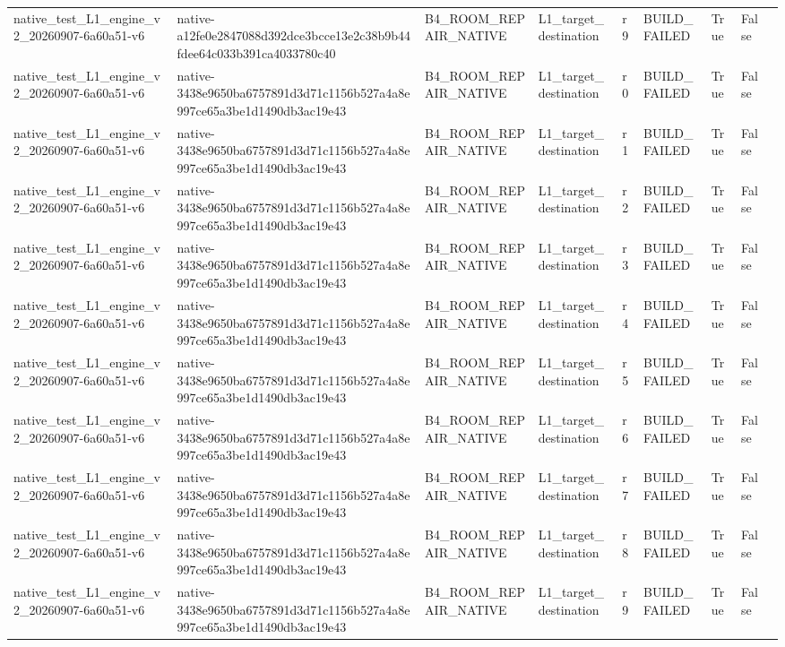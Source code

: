 \begin{tabular}{lllllllll}
native\_test\_L1\_engine\_v2\_20260907-6a60a51-v6 & native-a12fe0e2847088d392dce3bcce13e2c38b9b44fdee64c033b391ca4033780c40 & B4\_ROOM\_REPAIR\_NATIVE & L1\_target\_destination & r9 & BUILD\_FAILED & True & False &  \\
native\_test\_L1\_engine\_v2\_20260907-6a60a51-v6 & native-3438e9650ba6757891d3d71c1156b527a4a8e997ce65a3be1d1490db3ac19e43 & B4\_ROOM\_REPAIR\_NATIVE & L1\_target\_destination & r0 & BUILD\_FAILED & True & False &  \\
native\_test\_L1\_engine\_v2\_20260907-6a60a51-v6 & native-3438e9650ba6757891d3d71c1156b527a4a8e997ce65a3be1d1490db3ac19e43 & B4\_ROOM\_REPAIR\_NATIVE & L1\_target\_destination & r1 & BUILD\_FAILED & True & False &  \\
native\_test\_L1\_engine\_v2\_20260907-6a60a51-v6 & native-3438e9650ba6757891d3d71c1156b527a4a8e997ce65a3be1d1490db3ac19e43 & B4\_ROOM\_REPAIR\_NATIVE & L1\_target\_destination & r2 & BUILD\_FAILED & True & False &  \\
native\_test\_L1\_engine\_v2\_20260907-6a60a51-v6 & native-3438e9650ba6757891d3d71c1156b527a4a8e997ce65a3be1d1490db3ac19e43 & B4\_ROOM\_REPAIR\_NATIVE & L1\_target\_destination & r3 & BUILD\_FAILED & True & False &  \\
native\_test\_L1\_engine\_v2\_20260907-6a60a51-v6 & native-3438e9650ba6757891d3d71c1156b527a4a8e997ce65a3be1d1490db3ac19e43 & B4\_ROOM\_REPAIR\_NATIVE & L1\_target\_destination & r4 & BUILD\_FAILED & True & False &  \\
native\_test\_L1\_engine\_v2\_20260907-6a60a51-v6 & native-3438e9650ba6757891d3d71c1156b527a4a8e997ce65a3be1d1490db3ac19e43 & B4\_ROOM\_REPAIR\_NATIVE & L1\_target\_destination & r5 & BUILD\_FAILED & True & False &  \\
native\_test\_L1\_engine\_v2\_20260907-6a60a51-v6 & native-3438e9650ba6757891d3d71c1156b527a4a8e997ce65a3be1d1490db3ac19e43 & B4\_ROOM\_REPAIR\_NATIVE & L1\_target\_destination & r6 & BUILD\_FAILED & True & False &  \\
native\_test\_L1\_engine\_v2\_20260907-6a60a51-v6 & native-3438e9650ba6757891d3d71c1156b527a4a8e997ce65a3be1d1490db3ac19e43 & B4\_ROOM\_REPAIR\_NATIVE & L1\_target\_destination & r7 & BUILD\_FAILED & True & False &  \\
native\_test\_L1\_engine\_v2\_20260907-6a60a51-v6 & native-3438e9650ba6757891d3d71c1156b527a4a8e997ce65a3be1d1490db3ac19e43 & B4\_ROOM\_REPAIR\_NATIVE & L1\_target\_destination & r8 & BUILD\_FAILED & True & False &  \\
native\_test\_L1\_engine\_v2\_20260907-6a60a51-v6 & native-3438e9650ba6757891d3d71c1156b527a4a8e997ce65a3be1d1490db3ac19e43 & B4\_ROOM\_REPAIR\_NATIVE & L1\_target\_destination & r9 & BUILD\_FAILED & True & False &  \\

\end{tabular}
